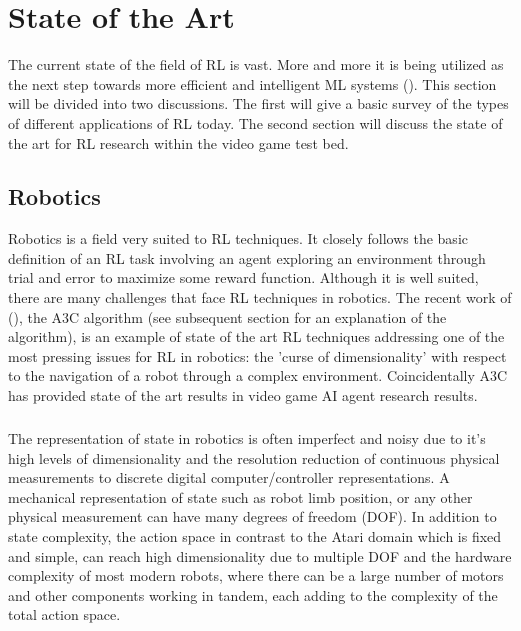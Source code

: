 \chapter{State of the Art}
The current state of the field of RL is vast. More and more it is being utilized as the next step towards more efficient and intelligent ML systems (\citet{survey-drl}). This section will be divided into two discussions. The first will give a basic survey of the types of different applications of RL today. The second section will discuss the state of the art for RL research within the video game test bed.

\section{Robotics}
Robotics is a field very suited to RL techniques. It closely follows the basic definition of an RL task involving an agent exploring an environment through trial and error to maximize some reward function. Although it is well suited, there are many challenges that face RL techniques in robotics. The recent work of (\citet{a3c}), the A3C algorithm (see subsequent section for an explanation of the algorithm), is an example of state of the art RL techniques addressing one of the most pressing issues for RL in robotics: the 'curse of dimensionality' with respect to the navigation of a robot through a complex environment. Coincidentally A3C has provided state of the art results in video game AI agent research results. \paragraph{}

The representation of state in robotics is often imperfect and noisy due to it's high levels of dimensionality and the resolution reduction of continuous physical measurements to discrete digital computer/controller representations. A mechanical representation of state such as robot limb position, or any other physical measurement can have many degrees of freedom (DOF). In addition to state complexity, the action space in contrast to the Atari domain which is fixed and simple, can reach high dimensionality due to multiple DOF and the hardware complexity of most modern robots, where there can be a large number of motors and other components working in tandem, each adding to the complexity of the total action space. \paragraph{}


